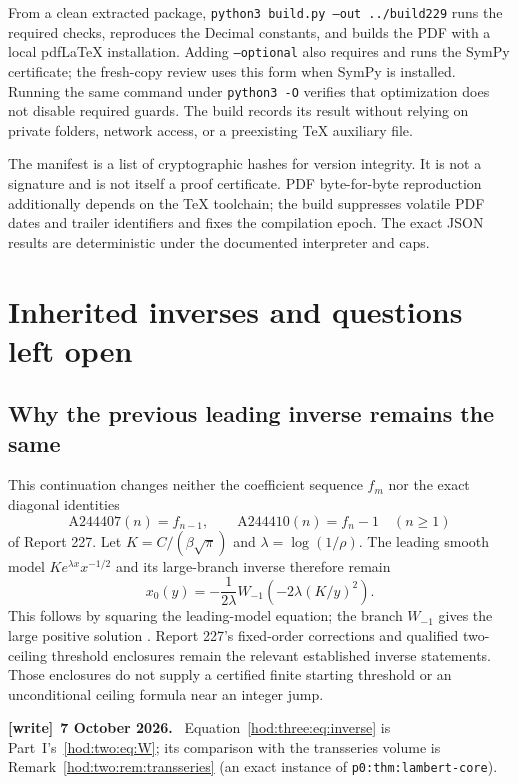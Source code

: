 \documentclass[11pt,letterpaper]{article}
\theoremstyle{definition}\newtheorem{definition}[theorem]{Definition}
\theoremstyle{remark}\newtheorem{remark}[theorem]{Remark}
\newcommand{\file}[1]{\nolinkurl{#1}}
\newenvironment{writenote}[1][]{\par\smallskip\begingroup\small
 \noindent\textbf{[write]}\if\relax\detokenize{#1}\relax\else~\textbf{#1.}\fi\ }%
 {\par\endgroup\smallskip}
\begin{document}
From a clean extracted package, \texttt{python3 build.py --out ../build229} runs the required checks, reproduces the Decimal constants, and builds the PDF with a local pdfLaTeX installation. Adding \texttt{--optional} also requires and runs the SymPy certificate; the fresh-copy review uses this form when SymPy is installed. Running the same command under \texttt{python3 -O} verifies that optimization does not disable required guards. The build records its result without relying on private folders, network access, or a preexisting TeX auxiliary file.

The manifest is a list of cryptographic hashes for version integrity. It is not a signature and is not itself a proof certificate. PDF byte-for-byte reproduction additionally depends on the TeX toolchain; the build suppresses volatile PDF dates and trailer identifiers and fixes the compilation epoch. The exact JSON results are deterministic under the documented interpreter and caps.

\section{Inherited inverses and questions left open}\label{hod:three:sec:outlook}
\subsection{Why the previous leading inverse remains the same}
This continuation changes neither the coefficient sequence $f_m$ nor the exact diagonal identities
\[
\mathrm{A244407}(n)=f_{n-1},\qquad
\mathrm{A244410}(n)=f_n-1\quad(n\ge1)
\]
of Report 227. Let $K=C/(\beta\sqrt\pi)$ and $\lambda=\log(1/\rho)$. The leading smooth model $K e^{\lambda x}x^{-1/2}$ and its large-branch inverse therefore remain
\begin{equation}\label{hod:three:eq:inverse}
x_0(y)=-\frac1{2\lambda}W_{-1}\!\left(-2\lambda(K/y)^2\right).
\end{equation}
This follows by squaring the leading-model equation; the branch $W_{-1}$ gives the large positive solution \cite{corless}. Report 227's fixed-order corrections and qualified two-ceiling threshold enclosures remain the relevant established inverse statements. Those enclosures do not supply a certified finite starting threshold or an unconditional ceiling formula near an integer jump.
\begin{writenote}[7 October 2026]
Equation~\eqref{hod:three:eq:inverse} is Part~I's~\eqref{hod:two:eq:W}; its
comparison with the transseries volume is Remark~\ref{hod:two:rem:transseries}
(an exact instance of \file{p0:thm:lambert-core}).
\end{writenote}
\end{document}
